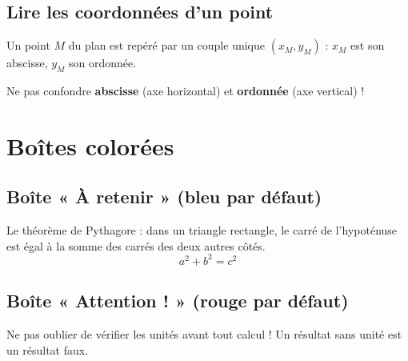 \documentclass[11pt,a4paper]{article}
\begin{document}
\begin{center}
\reperegradue[bg={(-3,-3)}, hd={(5,5)},
              points={A/(3,2)/blue, B/(-2,1)/green, C/(1,-2)/red}]
\end{center}

\subsection{Lire les coordonnées d'un point}

\begin{retenir}
    Un point $M$ du plan est repéré par un couple unique $(x_M, y_M)$ :
    $x_M$ est son abscisse, $y_M$ son ordonnée.
\end{retenir}

\begin{center}
\reperegradue[bg={(-4,-4)}, hd={(4,4)},
              points={M/(2,3)/orange}]
\end{center}

\begin{vigilance}
    Ne pas confondre \textbf{abscisse} (axe horizontal) et
    \textbf{ordonnée} (axe vertical) !
\end{vigilance}

\section{Boîtes colorées}

\subsection{Boîte « À retenir » (bleu par défaut)}

\begin{retenir}
    Le théorème de Pythagore : dans un triangle rectangle, le carré de
    l'hypoténuse est égal à la somme des carrés des deux autres côtés.
    \[
        a^2 + b^2 = c^2
    \]
\end{retenir}

\subsection{Boîte « Attention ! » (rouge par défaut)}

\begin{vigilance}
    Ne pas oublier de vérifier les unités avant tout calcul !
    Un résultat sans unité est un résultat faux.
\end{vigilance}
\end{document}
